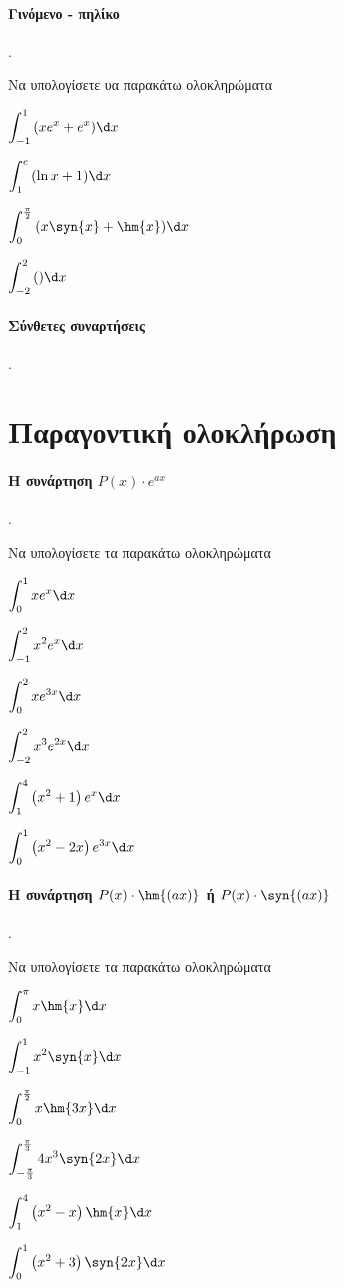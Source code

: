 \documentclass[11pt,a4paper,twocolumn]{article}
\newcounter{askhsh}
\newcommand{\askhsh}{\large\theaskhsh.\ \addtocounter{askhsh}{1}}
\begin{document}
\paragraph{Γινόμενο - πηλίκο}
\askhsh Να υπολογίσετε υα παρακάτω ολοκληρώματα
\begin{alist}
\item $\displaystyle\int_{-1}^{1}{(xe^x+e^x)\d x}$
\item $\displaystyle\int_{1}^{e}{(\ln{x}+1)\d x}$
\item $\displaystyle\int_{0}^{\frac{\pi}{2}}{(x\syn{x}+\hm{x})\d x}$
\item $\displaystyle\int_{-2}^{2}{()\d x}$
\end{alist}
\paragraph{Σύνθετες συναρτήσεις}
\askhsh
\section{Παραγοντική ολοκλήρωση}
\paragraph{Η συνάρτηση $P(x)\cdot e^{ax}$}
\askhsh Να υπολογίσετε τα παρακάτω ολοκληρώματα
\begin{multicols}{2}
\begin{alist}
\item $\displaystyle\int_{0}^{1}{xe^x\d x}$
\item $\displaystyle\int_{-1}^{2}{x^2e^x\d x} $
\item $\displaystyle\int_{0}^{2}{xe^{3x}\d x}$
\item $\displaystyle\int_{-2}^{2}{x^3e^{2x}\d x}$
\item $\displaystyle\int_{1}^{4}{\left(x^2+1\right)e^x \d x}$
\item $\displaystyle\int_{0}^{1}{\left(x^2-2x\right)e^{3x}\d x}$
\end{alist}
\end{multicols}
\paragraph{Η συνάρτηση $P(x)\cdot \hm{(ax)}$ ή $P(x)\cdot\syn{(ax)}$}
\askhsh Να υπολογίσετε τα παρακάτω ολοκληρώματα
\begin{multicols}{2}
\begin{alist}
\item $\displaystyle\int_{0}^{\pi}{x\hm{x}\d x}$
\item $\displaystyle\int_{-1}^{1}{x^2\syn{x}\d x} $
\item $\displaystyle\int_{0}^{\frac{\pi}{2}}{x\hm{3x}\d x}$
\item $\displaystyle\int_{-\frac{\pi}{3}}^{\frac{\pi}{3}}{4x^3\syn{2x}\d x}$
\item $\displaystyle\int_{1}^{4}{\left(x^2-x\right)\hm{x} \d x}$
\item $\displaystyle\int_{0}^{1}{\left(x^2+3\right)\syn{2x}\d x}$
\end{alist}
\end{multicols}
\end{document}
